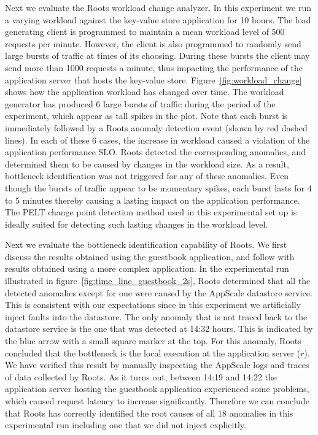Next we evaluate the Roots workload change analyzer. In this experiment we run a varying workload
against the key-value store application for 10 hours. The load generating client is programmed
to maintain a mean workload level of 500 requests per minute. However, the client
is also programmed to randomly send large bursts of traffic at times of its choosing. During these bursts 
the client may send more than 1000 requests a minute, thus impacting the performance of
the application server that hosts the key-value store. Figure~\ref{fig:workload_change} shows how
the application workload has changed over time. The workload generator has produced 6 large bursts of traffic during the 
period of the experiment, which appear as tall spikes in the plot.
Note that each burst is immediately followed by a Roots anomaly detection event (shown by red dashed lines). 
In each of these 6 cases, the increase in workload caused a violation of the application performance SLO.
Roots detected the corresponding anomalies, and determined them to be caused by changes in the workload size.
As a result, bottleneck identification was not triggered for any of these anomalies.
Even though the bursts of traffic appear to be momentary
spikes, each burst lasts for 4 to 5 minutes thereby causing a lasting impact on the application performance.
The PELT change point detection method used in this experimental set up is ideally suited for detecting
such lasting changes in the workload level.

Next we evaluate the bottleneck identification capability of Roots. We first discuss the results obtained using
the guestbook application, and follow with
results obtained using a more complex application.
In the experimental run illustrated in 
figure~\ref{fig:time_line_guestbook_2s}, Roots determined that all the detected anomalies except for one were 
caused by the AppScale datastore service. This is consistent with our expectations since in this experiment we 
artificially inject faults into the datastore. 
The only anomaly that is not traced back to the datastore service is the one that was detected at 14:32 hours.
This is indicated by the blue arrow with a small square marker at the top. For this anomaly, Roots concluded that
the bottleneck is the local execution at the application server ($r$). We have verified
this result by manually inspecting the AppScale logs and traces of data collected by Roots. As it turns out,
between 14:19 and
14:22 the application server hosting the guestbook application experienced some problems, which caused
request latency to increase significantly. Therefore we can conclude that Roots has correctly identified 
the root causes of all 18 anomalies in this experimental run
including one that we did not inject explicitly. 

